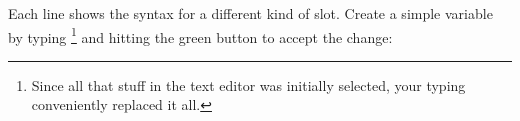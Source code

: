 \documentclass[letterpaper,10pt,english]{sphinxmanual}
\begin{document}
Each line shows the syntax for a different kind of slot. Create a simple variable by typing
 \footnote{
Since all that stuff in the text editor was initially selected, your typing conveniently replaced it all.
} and hitting the green button to accept the change:
\begin{figure}[htbp]\begin{flushleft}

\end{flushleft}\end{figure}
\end{document}
